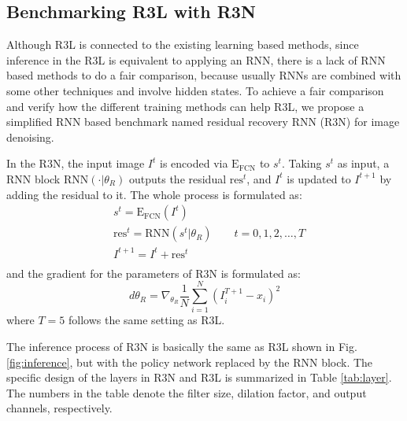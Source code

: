\documentclass{article}
\begin{document}
\subsection{Benchmarking R3L with R3N}
Although R3L is connected to the existing learning based methods, since inference in the R3L is equivalent to applying an RNN, there is a lack of RNN based methods to do a fair comparison, because usually RNNs are combined with some other techniques and involve hidden states. To achieve a fair comparison and verify how the different training methods can help R3L, we propose a simplified RNN based benchmark named residual recovery RNN (R3N) for image denoising.

In the R3N, the input image $I^t$ is encoded via $\text{E}_\text{FCN}$ to $s^t$. Taking $s^t$ as input, a RNN block $\text{RNN}(\cdot|\theta_R)$ outputs the residual $\text{res}^t$, and $I^t$ is updated to $I^{t+1}$ by adding the residual to it. The whole process is formulated as:
\begin{equation}
\begin{aligned}
     &s^t = \text{E}_\text{FCN}(I^t)\\
     &\text{res}^t = \text{RNN}(s^t|\theta_R) \quad \quad t = 0,1,2,\dots,T\\
     &I^{t+1} = I^t + \text{res}^t\\
\end{aligned}
\end{equation}
and the gradient for the parameters of R3N is formulated as:
\begin{equation}
     d\theta_R = \nabla_{\theta_R}\frac{1}{N}\sum_{i=1}^N(I_i^{T+1}-x_i)^2
\end{equation}
where $T=5$ follows the same setting as R3L. \par
The inference process of R3N is basically the same as R3L shown in Fig.\ref{fig:inference}, but with the policy network replaced by the $\text{RNN}$ block. The specific design of the layers in R3N and R3L is summarized in Table \ref{tab:layer}. The numbers in the table denote the filter size, dilation factor, and output channels, respectively.
\end{document}
